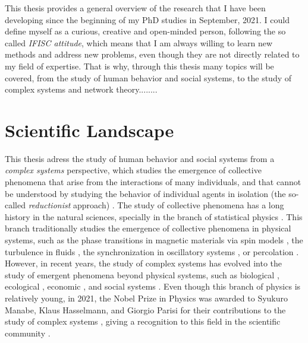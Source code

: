 \setcounter{page}{1}

This thesis provides a general overview of the research that I have been developing since the beginning of my PhD studies in September, 2021. I could define myself as a curious, creative and open-minded person, following the so called \textit{IFISC attitude}, which means that I am always willing to learn new methods and address new problems, even though they are not directly related to my field of expertise. That is why, through this thesis many topics will be covered, from the study of human behavior and social systems, to the study of complex systems and network theory........

\section{\label{sec:scie_lands} Scientific Landscape}

This thesis adress the study of human behavior and social systems from a \textit{complex systems} perspective, which studies the emergence of collective phenomena that arise from the interactions of many individuals, and that cannot be understood by studying the behavior of individual agents in isolation (the so-called \textit{reductionist} approach) \cite{anderson1972more}. The study of collective phenomena has a long history in the natural sciences, specially in the branch of statistical physics \cite{stanley1971phase}. This branch traditionally studies the emergence of collective phenomena in physical systems, such as the phase transitions in magnetic materials via spin models \cite{onsager-1944}, the turbulence in fluids \cite{frisch1995turbulence}, the synchronization in oscillatory systems \cite{pikovsky2001universal}, or percolation \cite{stauffer-1985}. However, in recent years, the study of complex systems has evolved into the study of emergent phenomena beyond physical systems, such as biological \cite{prigogine1977self}, ecological \cite{may-2001}, economic \cite{arthur-1994}, and social systems \cite{castellano-2009}. Even though this branch of physics is relatively young, in 2021, the Nobel Prize in Physics was awarded to Syukuro Manabe, Klaus Hasselmann, and Giorgio Parisi for their contributions to the study of complex systems \cite{nobel-2021}, giving a recognition to this field in the scientific community \cite{bianconi2023complex}.

